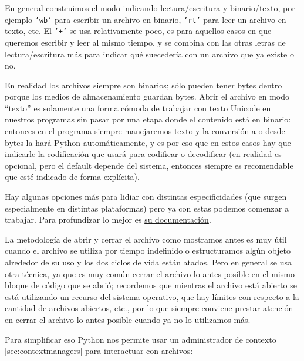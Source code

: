 En general construimos el modo indicando lectura/escritura y binario/texto, por ejemplo \texttt{'wb'} para escribir un archivo en binario, \texttt{'rt'} para leer un archivo en texto, etc. El \texttt{'+'} se usa relativamente poco, es para aquellos casos en que queremos escribir y leer al mismo tiempo, y se combina con las otras letras de lectura/escritura más para indicar qué suecedería con un archivo que ya existe o no.


En realidad los archivos siempre son binarios; sólo pueden tener bytes dentro porque los medios de almacenamiento guardan bytes. Abrir el archivo en modo ``texto'' es solamente una forma cómoda de trabajar con texto Unicode en nuestros programas sin pasar por una etapa donde el contenido está en binario: entonces en el programa siempre manejaremos texto y la conversión a o desde bytes la hará Python automáticamente, y es por eso que en estos casos hay que indicarle la codificación que usará para codificar o decodificar (en realidad es opcional, pero el default depende del sistema, entonces siempre es recomendable que esté indicado de forma explícita).


Hay algunas opciones más para lidiar con distintas especificidades (que surgen especialmente en distintas plataformas) pero ya con estas podemos comenzar a trabajar. Para profundizar lo mejor es \href{https://docs.python.org/dev/library/functions.html#open}{su documentación}.

La metodología de abrir y cerrar el archivo como mostramos antes es muy útil cuando el archivo se utiliza por tiempo indefinido o estructuramos algún objeto alrededor de su uso y los dos ciclos de vida están atados. Pero en general se usa otra técnica, ya que es muy común cerrar el archivo lo antes posible en el mismo bloque de código que se abrió; recordemos que mientras el archivo está abierto se está utilizando un recurso del sistema operativo, que hay límites con respecto a la cantidad de archivos abiertos, etc., por lo que siempre conviene prestar atención en cerrar el archivo lo antes posible cuando ya no lo utilizamos más.

Para simplificar eso Python nos permite usar un administrador de contexto \ref{sec:contextmanagers} para interactuar con archivos:


